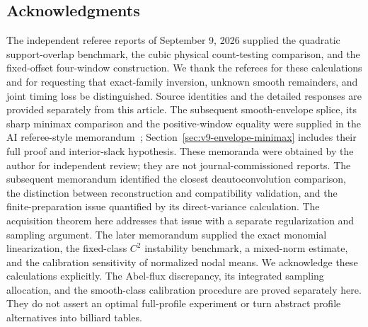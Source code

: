 \subsection*{Acknowledgments}
The independent referee reports of September 9, 2026 supplied the
quadratic support-overlap benchmark, the cubic physical count-testing
comparison, and the fixed-offset four-window construction. We thank the
referees for these calculations and for requesting that exact-family
inversion, unknown smooth remainders, and joint timing loss be
distinguished. Source identities and the detailed responses are
provided separately from this article. The subsequent smooth-envelope
splice, its sharp minimax comparison and the positive-window equality
were supplied in the AI referee-style memorandum~\cite{A2ReviewV8};
Section~\ref{sec:v9-envelope-minimax} includes their full proof and
interior-slack hypothesis. These memoranda were obtained by the author
for independent review; they are not journal-commissioned reports. The subsequent memorandum
\cite{A2ReviewV9} identified the closest deautoconvolution comparison,
the distinction between reconstruction and compatibility validation,
and the finite-preparation issue quantified by its direct-variance
calculation. The acquisition theorem here addresses that issue with
a separate regularization and sampling argument. The later memorandum
\cite{A2ReviewV10} supplied the exact monomial linearization,
the fixed-class $C^2$ instability benchmark, a mixed-norm estimate,
and the calibration sensitivity of normalized nodal means. We acknowledge
these calculations explicitly. The Abel-flux discrepancy, its integrated
sampling allocation, and the smooth-class calibration procedure are
proved separately here. They do not assert an optimal full-profile
experiment or turn abstract profile alternatives into billiard tables.
\appendix






















